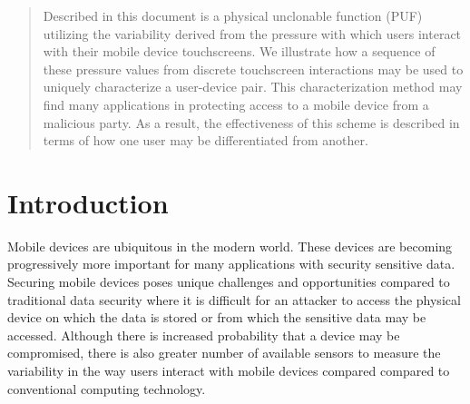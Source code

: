 \documentclass{acm_proc_article-sp}
\begin{document}

\maketitle
\begin{abstract}
Described in this document is a physical unclonable function (PUF) utilizing the variability derived from the pressure with which users interact with their mobile device touchscreens. We illustrate how a sequence of these pressure values from discrete touchscreen interactions may be used to uniquely characterize a user-device pair. This characterization method may find many applications in protecting access to a mobile device from a malicious party. As a result, the effectiveness of this scheme is described in terms of how one user may be differentiated from another.
\end{abstract}




\section{Introduction}
\label{sec:intro}
Mobile devices are ubiquitous in the modern world. These devices are becoming progressively more important for many applications with security sensitive data. 
Securing mobile devices poses unique challenges and opportunities compared to traditional data security where it is difficult for an attacker to access the physical device on which the data is stored or from which the sensitive data may be accessed. Although there is increased probability that a device may be compromised, there is also greater number of available sensors to measure the variability in the way users interact with mobile devices compared compared to conventional computing technology.
%
\end{document}
